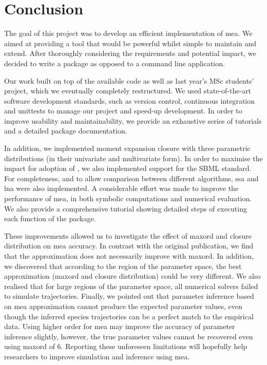 \section{Conclusion} \label{sec:conclus}

The goal of this project was to develop an efficient \py{} implementation of \acrlong{mea}.
We aimed at providing a tool that would be powerful whilst simple to maintain and extend.
After thoroughly considering the requirements and potential impact, we decided to write a \py{} package as opposed to a command line application.

Our work built on top of the available \mat{} code as well as last year's MSc students' project, which we eventually completely restructured.
We used state-of-the-art software development standards, such as version control, continuous integration and unittests to manage our project and speed-up development.
In order to improve usability and maintainability, we provide an exhaustive series of tutorials and a detailed package documentation.

In addition, we implemented moment expansion closure with three parametric distributions (in their univariate and multivariate form).
In order to maximise the impact for adoption of \means, we also implemented support for the SBML standard.
For completeness, and to allow comparison between different algorithms, \gls{ssa} and \gls{lna} were also implemented.
A considerable effort was made to improve the performance of \gls{mea},  in both symbolic computations and numerical evaluation.
We also provide a comprehensive tutorial showing detailed steps of executing each function of the package.

These improvements allowed us to investigate the effect of \gls{maxord} and closure distribution on \gls{mea} accuracy.
In contrast with the original publication, we find that the approximation does not necessarily improve with \gls{maxord}.
In addition, we discovered that according to the region of the parameter space, the best approximation (\gls{maxord} and closure distribution) could be very different.
We also realised that for large regions of the parameter space, all numerical solvers failed to simulate trajectories.
Finally, we pointed out that parameter inference based on \gls{mea} approximation cannot produce the expected parameter values, even though the inferred species trajectories can be a perfect match to the empirical data. Using higher order for \gls{mea} may improve the accuracy of parameter inference slightly, however, the true parameter values cannot be recovered even using \gls{maxord} of 6.
Reporting these unforeseen limitations will hopefully help researchers to improve simulation and inference using \gls{mea}.


